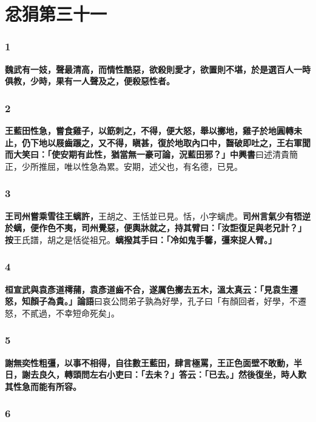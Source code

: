 \chapter{忿狷第三十一}

\subsection*{1}

\textbf{魏武有一妓，聲最清高，而情性酷惡，欲殺則愛才，欲置則不堪，於是選百人一時俱教，少時，果有一人聲及之，便殺惡性者。}

\subsection*{2}

\textbf{王藍田性急，嘗食雞子，以筯刺之，不得，便大怒，舉以擲地，雞子於地圓轉未止，仍下地以屐齒蹍之，又不得，瞋甚，復於地取內口中，齧破即吐之，王右軍聞而大笑曰：「使安期有此性，猶當無一豪可論，況藍田邪？」}{\footnotesize \textbf{中興書}曰述清貴簡正，少所推屈，唯以性急為累。安期，述父也，有名德，已見。}

\subsection*{3}

\textbf{王司州嘗乘雪往王螭許，}{\footnotesize 王胡之、王恬並已見。恬，小字螭虎。}\textbf{司州言氣少有牾逆於螭，便作色不夷，司州覺惡，便輿牀就之，持其臂曰：「汝詎復足與老兄計？」}{\footnotesize \textbf{按}王氏譜，胡之是恬從祖兄。}\textbf{螭撥其手曰：「冷如鬼手馨，彊來捉人臂。」}

\subsection*{4}

\textbf{桓宣武與袁彥道樗蒱，袁彥道齒不合，遂厲色擲去五木，溫太真云：「見袁生遷怒，知顏子為貴。」}{\footnotesize \textbf{論語}曰哀公問弟子孰為好學，孔子曰「有顏回者，好學，不遷怒，不貳過，不幸短命死矣」。}

\subsection*{5}

\textbf{謝無奕性粗彊，以事不相得，自往數王藍田，肆言極罵，王正色面壁不敢動，半日，謝去良久，轉頭問左右小吏曰：「去未？」答云：「已去。」然後復坐，時人歎其性急而能有所容。}

\subsection*{6}

